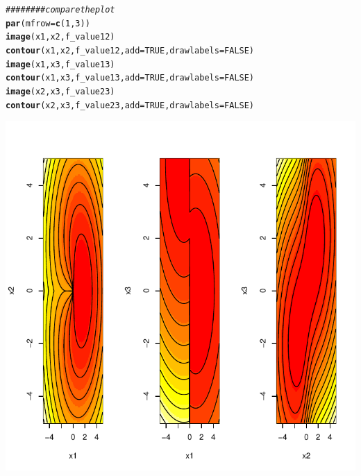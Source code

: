 \documentclass{article}\usepackage[]{graphicx}\usepackage[]{color}
\makeatletter
\def\maxwidth{ %
  \ifdim\Gin@nat@width>\linewidth
    \linewidth
  \else
    \Gin@nat@width
  \fi
}
\newcommand{\hlnum}[1]{\textcolor[rgb]{0.686,0.059,0.569}{#1}}%
\newcommand{\hlcom}[1]{\textcolor[rgb]{0.678,0.584,0.686}{\textit{#1}}}%
\newcommand{\hlstd}[1]{\textcolor[rgb]{0.345,0.345,0.345}{#1}}%
\newcommand{\hlkwc}[1]{\textcolor[rgb]{0.333,0.667,0.333}{#1}}%
\newcommand{\hlkwd}[1]{\textcolor[rgb]{0.737,0.353,0.396}{\textbf{#1}}}%
\newenvironment{kframe}{%
 \def\at@end@of@kframe{}%
 \ifinner\ifhmode%
  \def\at@end@of@kframe{\end{minipage}}%
  \begin{minipage}{\columnwidth}%
 \fi\fi%
 \def\FrameCommand##1{\hskip\@totalleftmargin \hskip-\fboxsep
 \colorbox{shadecolor}{##1}\hskip-\fboxsep
     \hskip-\linewidth \hskip-\@totalleftmargin \hskip\columnwidth}%
 \MakeFramed {\advance\hsize-\width
   \@totalleftmargin\z@ \linewidth\hsize
   \@setminipage}}%
 {\par\unskip\endMakeFramed%
 \at@end@of@kframe}
\newenvironment{knitrout}{}{} %
\makeatother
\begin{document}
\begin{knitrout}
\color{fgcolor}\begin{kframe}
\begin{alltt}
\hlcom{########compare the plot}
\hlkwd{par}\hlstd{(}\hlkwc{mfrow}\hlstd{=}\hlkwd{c}\hlstd{(}\hlnum{1}\hlstd{,}\hlnum{3}\hlstd{))}
\hlkwd{image}\hlstd{(x1,x2,f_value12)}
\hlkwd{contour}\hlstd{(x1,x2,f_value12,}\hlkwc{add}\hlstd{=}\hlnum{TRUE}\hlstd{,}\hlkwc{drawlabels} \hlstd{=} \hlnum{FALSE}\hlstd{)}
\hlkwd{image}\hlstd{(x1,x3,f_value13)}
\hlkwd{contour}\hlstd{(x1,x3,f_value13,}\hlkwc{add}\hlstd{=}\hlnum{TRUE}\hlstd{,}\hlkwc{drawlabels} \hlstd{=} \hlnum{FALSE}\hlstd{)}
\hlkwd{image}\hlstd{(x2,x3,f_value23)}
\hlkwd{contour}\hlstd{(x2,x3,f_value23,}\hlkwc{add}\hlstd{=}\hlnum{TRUE}\hlstd{,}\hlkwc{drawlabels} \hlstd{=} \hlnum{FALSE}\hlstd{)}
\end{alltt}
\end{kframe}
\includegraphics[width=\maxwidth]{figure/r-chunk6-1} 

\end{knitrout}
\end{document}
